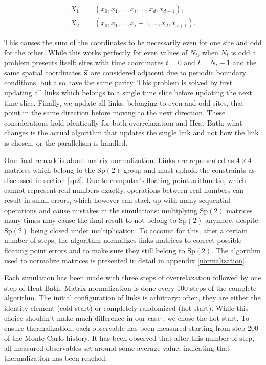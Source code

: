 \documentclass[reqno,12pt]{article}
\numberwithin{equation}{section}
\newcommand{\Sp}{\mathrm{Sp}}
\begin{document}
\begin{equation}
	\begin{aligned}
	X_1 &= (x_0, x_1, \dots, x_i, \dots, x_d, x_{d+1}), \\
	X_2 &= (x_0, x_1, \dots, x_i + 1, \dots, x_d, x_{d+1}).
	\end{aligned}
\end{equation}

This causes the sum of the coordinates to be necessarily even for one site and odd for the other. While this works
perfectly for even values of $N_t$, when $N_t$ is odd a problem presents itself: sites with time coordinates
$t = 0$ and $t = N_t - 1$ and the same spatial coordinates $\va{x}$ are considered 
adjacent due to periodic boundary conditions, but also have the same parity. This problem is solved by first
updating all links which belongs to a single time slice before updating the next time slice. Finally,
we update all links, belonging to even and odd sites, that point in the same direction before moving to the 
next direction. These considerations hold identically for both overrelaxation and Heat-Bath: what changes is the
actual algorithm that updates the single link and not how the link is chosen, or the parallelism is handled.

One final remark is about matrix normalization. Links are represented as $4 \times 4$ matrices which belong
to the $\Sp(2)$ group and must uphold the constraints as discussed in section \ref{sp2}. Due to computer's floating 
point arithmetic, which cannot represent real numbers exactly, operations between real numbers can result in small 
errors, which however can stack up with many sequential operations and cause mistakes in the simulations: multiplying
$\Sp(2)$ matrices many times may cause the final result to not belong to $\Sp(2)$ anymore, despite $\Sp(2)$ being 
closed under multiplication. To account for this, after a certain number of steps, the algorithm
normalizes links matrices to correct possible floating point errors and to make sure they still belong to $\Sp(2)$. 
The algorithm used to normalize matrices is presented in detail in appendix \ref{normalization}.

Each simulation has been made with three steps of overrelaxation followed by one step of Heat-Bath. Matrix normalization
is done every 100 steps of the complete algorithm. The initial configuration of links is arbitrary: often, they
are either the identity element (cold start) or completely randomized (hot start). While this choice
shouldn't make much difference in our case \cite{pepe}, we chose the hot start. To ensure thermalization,
each observable has been measured starting from step 200 of the Monte Carlo history. It has been observed that after 
this number of step, all measured observables set around some average value, indicating that thermalization has been
reached.
\end{document}
